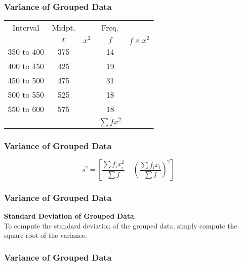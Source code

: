 \documentclass{beamer}
\begin{document}
\begin{frame}
\frametitle{Variance of Grouped Data}
{
\begin{center}
\Large

\begin{tabular}{|c|c|c|c|c|}
\hline Interval & Midpt. & \phantom{spacespa}  & Freq. &  \\ 
& $x$& $x^2$ & $f$ &  \phantom{sp}$f \times x^2$ \phantom{sp}\\ 
\hline \hline 350 to 400 & 375  & & 14&  \\ 
\hline 400 to 450 & 425 & &   19& \\ 
\hline 450 to 500 & 475 & &   31&\\ 
\hline 500 to 550 & 525 & &   18&\\ 
\hline 550 to 600 & 575 & &   18&\\ \hline

\hline &  & &   $\sum f x^2$ &\\ \hline
\hline 
\end{tabular} 
\end{center}
}

\end{frame}

\begin{frame}
\frametitle{Variance of Grouped Data}
{
\LARGE
\vspace{-2.6cm}
\[ s^2 = \left[ \frac{\sum f_ix_i^2}{\sum f} - \left(\frac{\sum f_ix_i}{\sum f}\right)^2 \right] \]
\bigskip


}

\end{frame}
\begin{frame}
\frametitle{Variance of Grouped Data}
\LARGE
\vspace{-1.5cm}
\textbf{Standard Deviation of Grouped Data}:\\
To compute the standard deviation of the grouped data, simply compute the square root of the variance.

\end{frame}
\begin{frame}
\frametitle{Variance of Grouped Data}
\end{frame}
\end{document}
